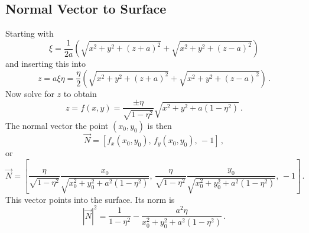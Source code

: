 \documentclass[a4paper,10pt]{article}
\numberwithin{equation}{section}
\begin{document}
\subsection{Normal Vector to Surface}
  Starting with
  \begin{equation}
    \xi = \frac{1}{2a}\left( \sqrt{x^2 + y^2 + (z+a)^2} + \sqrt{x^2 + y^2 + (z-a)^2} \right)
  \end{equation}
  and inserting this into
  \begin{equation}
    z = a\xi\eta = \frac{\eta}{2} \left( \sqrt{x^2 + y^2 + (z+a)^2} + \sqrt{x^2 + y^2 + (z-a)^2} \right)\, .
  \end{equation}
  Now solve for \(z\) to obtain
  \begin{equation}
   z = f(x,y) = \frac{\pm\eta}{\sqrt{1-\eta^2}} \sqrt{x^2 + y^2 + a(1-\eta^2)}\, .
  \end{equation}
  The normal vector the point \((x_0, y_0)\) is then
  \begin{equation}
    \vec{N} = [f_x(x_0, y_0),\, f_y(x_0, y_0),\, -1]\, ,
  \end{equation}
  or
  \begin{equation}
   \vec{N} = \left[\frac{\eta}{\sqrt{1-\eta^2}} \frac{x_0}{\sqrt{x_0^2 + y_0^2 + a^2(1-\eta^2)}},\, \frac{\eta}{\sqrt{1-\eta^2}} \frac{y_0}{\sqrt{x_0^2 + y_0^2 + a^2(1-\eta^2)}},\, -1\right]\, .
  \end{equation}
  This vector points into the surface. Its norm is
  \begin{equation}
   |\vec{N}|^2 = \frac{1}{1-\eta^2} - \frac{a^2\eta}{x_0^2 + y_0^2 + a^2(1-\eta^2)}\, .
  \end{equation}
%
\end{document}

